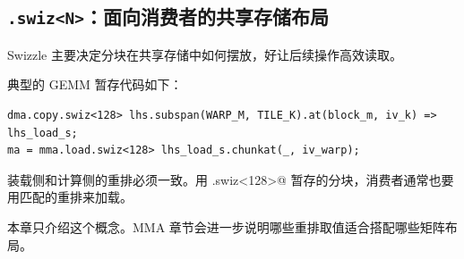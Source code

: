 \subsection*{\texttt{.swiz\textless{}N\textgreater{}}：面向消费者的共享存储布局}

Swizzle 主要决定分块在共享存储中如何摆放，好让后续操作高效读取。

典型的 GEMM 暂存代码如下：

\begin{lstlisting}[language=croqtile,caption={\texttt{.swiz\textless{}N\textgreater{}}：面向消费者的共享存储布局}]
dma.copy.swiz<128> lhs.subspan(WARP_M, TILE_K).at(block_m, iv_k) => lhs_load_s;
ma = mma.load.swiz<128> lhs_load_s.chunkat(_, iv_warp);
\end{lstlisting}

装载侧和计算侧的重排必须一致。用 \co@.swiz<128>@ 暂存的分块，消费者通常也要用匹配的重排来加载。

本章只介绍这个概念。MMA 章节会进一步说明哪些重排取值适合搭配哪些矩阵布局。
